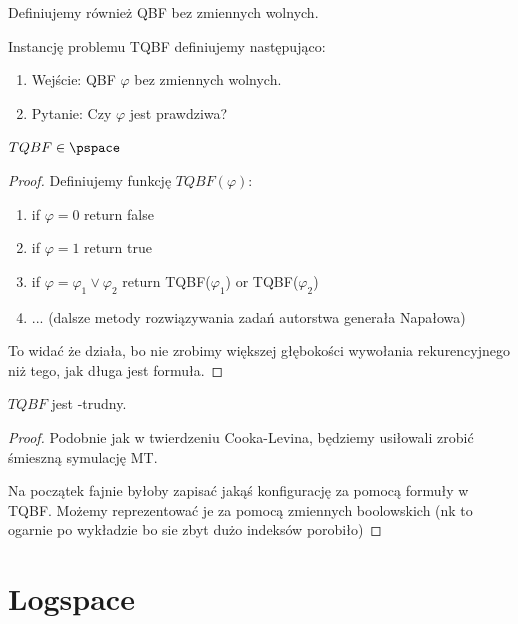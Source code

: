 \begin{definition}
     Definiujemy również QBF bez zmiennych wolnych. 
\end{definition}

\begin{definition} 
    Instancję problemu TQBF definiujemy następująco:
    
    \begin{enumerate}
        \item Wejście: QBF \( \varphi \) bez zmiennych wolnych. 
        \item Pytanie: Czy \( \varphi \) jest prawdziwa? 
    \end{enumerate}
\end{definition}

\begin{lemma}
    \( TQBF \in \pspace \)
\end{lemma}

\begin{proof}

    Definiujemy funkcję \( TQBF(\varphi) \):
    \begin{enumerate}
        \item if \(\varphi = 0\) return false 
        \item if \(\varphi = 1\) return true
        \item if \( \varphi = \varphi_1 \lor \varphi_2 \) return TQBF(\(\varphi_1\)) or TQBF(\(\varphi_2\)) 
        \item ... (dalsze metody rozwiązywania zadań autorstwa generała Napałowa)
    \end{enumerate}
    
    To widać że działa, bo nie zrobimy większej głębokości wywołania rekurencyjnego niż tego, jak długa jest formuła.
\end{proof}

\begin{lemma}
    \(TQBF\) jest \pspace-trudny.
\end{lemma}
\begin{proof}
    Podobnie jak w twierdzeniu Cooka-Levina, będziemy usiłowali zrobić śmieszną symulację MT. 
    
    Na początek fajnie byłoby zapisać jakąś konfigurację za pomocą formuły w TQBF. Możemy reprezentować je za pomocą zmiennych boolowskich (nk to ogarnie po wykładzie bo sie zbyt dużo indeksów porobiło)
\end{proof}


\section{Logspace}

